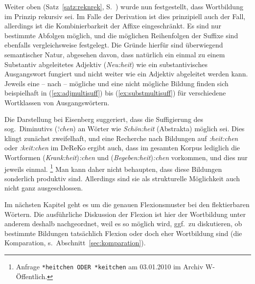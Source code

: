 Weiter oben (Satz~\ref{satz:reknrek}, S.~\pageref{satz:reknrek}) wurde nun festgestellt, dass Wortbildung im Prinzip rekursiv sei.
Im Falle der Derivation ist dies prinzipiell auch der Fall, allerdings ist die Kombinierbarkeit der Affixe eingeschränkt.
Es sind nur bestimmte Abfolgen möglich, und die möglichen Reihenfolgen der Suffixe sind ebenfalls vergleichsweise festgelegt.
Die Gründe hierfür sind überwiegend semantischer Natur, abgesehen davon, dass natürlich \zB ein einmal zu einem Substantiv abgeleitetes Adjektiv (\textit{Neu:heit}) wie ein substantivisches Ausgangswort fungiert und nicht weiter wie ein Adjektiv abgeleitet werden kann.
Jeweils eine -- nach \citealp{Eisenberg1} -- mögliche und eine nicht mögliche Bildung finden sich beispielhaft in (\ref{ex:adjmultisuff}) bis (\ref{ex:substmultisuff}) für verschiedene Wortklassen von Ausgangswörtern.


\begin{exe}
\end{exe}


Die Darstellung bei Eisenberg suggeriert, dass die Suffigierung des sog.\ Diminutivs (\textit{\~:chen}) an Wörter wie \textit{Schön:heit} (Abstrakta) möglich sei.
Dies klingt zunächst zweifelhaft, und eine Recherche nach Bildungen auf \textit{:heit:chen} oder \textit{:keit:chen} im DeReKo ergibt auch, dass im gesamten Korpus lediglich die Wortformen (\textit{Krank:heit})\textit{:chen} und (\textit{Begeben:heit})\textit{:chen} vorkommen, und dies nur jeweils einmal.%
\footnote{Anfrage \texttt{*heitchen ODER *keitchen} am 03.01.2010 im Archiv W-Öffentlich.}
Man kann daher nicht behaupten, dass diese Bildungen sonderlich produktiv sind.
Allerdings sind sie als strukturelle Möglichkeit auch nicht ganz ausgeschlossen.

Im nächsten Kapitel geht es um die genauen Flexionsmuster bei den flektierbaren Wörtern.
Die ausführliche Diskussion der Flexion ist hier der Wortbildung unter anderem deshalb nachgeordnet, weil es so möglich wird, ggf.\ zu diskutieren, ob bestimmte Bildungen tatsächlich Flexion oder doch eher Wortbildung sind (\zB die Komparation, s.\ Abschnitt~\ref{sec:komparation}).


